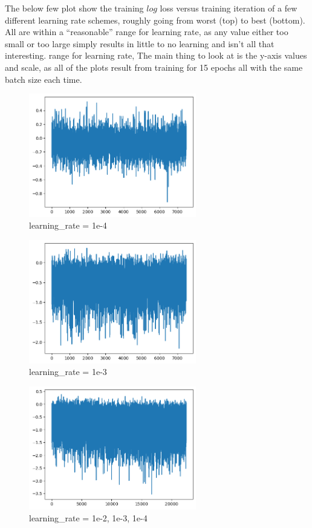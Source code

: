 \documentclass[12pt, twoside]{report}
\begin{document}
The below few plot show the training $log$ loss versus training iteration of a few different 
learning rate schemes, roughly going from worst (top) to best (bottom).
All are within a ``reasonable'' range for learning rate, as any value either too small or too large
simply results in little to no learning and isn't all that interesting.
range for learning rate,
The main thing to look at is the y-axis values and scale, as all of the plots result from training 
for 15 epochs all with the same batch size each time.

\begin{figure}[H]
    \centering
    \includegraphics[width=0.65\textwidth]{figures/1e-4.png}
    \caption*{learning\_rate = 1e-4}
\end{figure}

\begin{figure}[H]
    \centering
    \includegraphics[width=0.65\textwidth]{figures/1e-3.png}
    \caption*{learning\_rate = 1e-3}
\end{figure}

\begin{figure}[H]
    \centering
    \includegraphics[width=0.65\textwidth]{figures/1e-234.png}
    \caption*{learning\_rate = 1e-2, 1e-3, 1e-4}
\end{figure}
\end{document}
